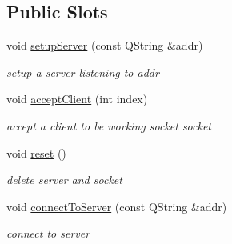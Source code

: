 \subsection*{Public Slots}
\begin{DoxyCompactItemize}
\item 
void \hyperlink{classRemoteInput_a433cbb8d886d2c4b8dd61afcc40ee237}{setup\+Server} (const Q\+String \&addr)
\begin{DoxyCompactList}\small\item\em setup a server listening to {\ttfamily addr} \end{DoxyCompactList}\item 
void \hyperlink{classRemoteInput_ac7b675466378716bf4b60481dac71777}{accept\+Client} (int index)
\begin{DoxyCompactList}\small\item\em accept a client to be working socket {\ttfamily socket} \end{DoxyCompactList}\item 
void \hyperlink{classRemoteInput_ac7268f7b0c862ae1d45e7c85ed40b975}{reset} ()
\begin{DoxyCompactList}\small\item\em delete server and socket \end{DoxyCompactList}\item 
void \hyperlink{classRemoteInput_a59e3292c1516aa98ffe4ba6f6a318379}{connect\+To\+Server} (const Q\+String \&addr)
\begin{DoxyCompactList}\small\item\em connect to server \end{DoxyCompactList}\end{DoxyCompactItemize}
